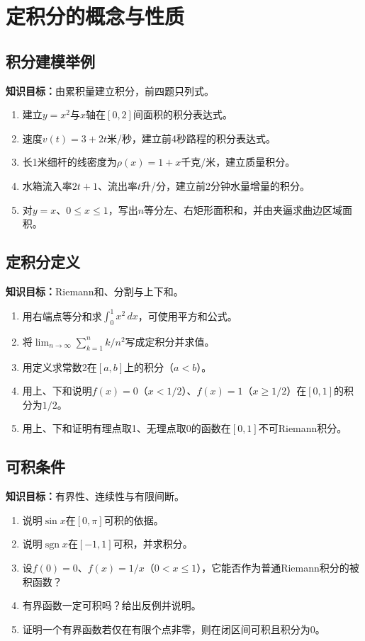 \documentclass[11pt,a4paper,fontset=fandol]{ctexrep}
\newcommand{\goal}[1]{\textbf{知识目标：}#1\par}
\begin{document}
\section{定积分的概念与性质}
\subsection{积分建模举例}
\goal{由累积量建立积分，前四题只列式。}
\begin{enumerate}
\item 建立$y=x^2$与$x$轴在$[0,2]$间面积的积分表达式。
\item 速度$v(t)=3+2t$米/秒，建立前4秒路程的积分表达式。
\item 长1米细杆的线密度为$\rho(x)=1+x$千克/米，建立质量积分。
\item 水箱流入率$2t+1$、流出率$t$升/分，建立前2分钟水量增量的积分。
\item 对$y=x$、$0\le x\le1$，写出$n$等分左、右矩形面积和，并由夹逼求曲边区域面积。
\end{enumerate}
\subsection{定积分定义}
\goal{Riemann和、分割与上下和。}
\begin{enumerate}
\item 用右端点等分和求$\int_0^1x^2\,dx$，可使用平方和公式。
\item 将$\lim_{n\to\infty}\sum_{k=1}^n k/n^2$写成定积分并求值。
\item 用定义求常数2在$[a,b]$上的积分（$a<b$）。
\item 用上、下和说明$f(x)=0$（$x<1/2$）、$f(x)=1$（$x\ge1/2$）在$[0,1]$的积分为$1/2$。
\item 用上、下和证明有理点取1、无理点取0的函数在$[0,1]$不可Riemann积分。
\end{enumerate}
\subsection{可积条件}
\goal{有界性、连续性与有限间断。}
\begin{enumerate}
\item 说明$\sin x$在$[0,\pi]$可积的依据。
\item 说明$\operatorname{sgn}x$在$[-1,1]$可积，并求积分。
\item 设$f(0)=0$、$f(x)=1/x$（$0<x\le1$），它能否作为普通Riemann积分的被积函数？
\item 有界函数一定可积吗？给出反例并说明。
\item 证明一个有界函数若仅在有限个点非零，则在闭区间可积且积分为0。
\end{enumerate}
\end{document}
